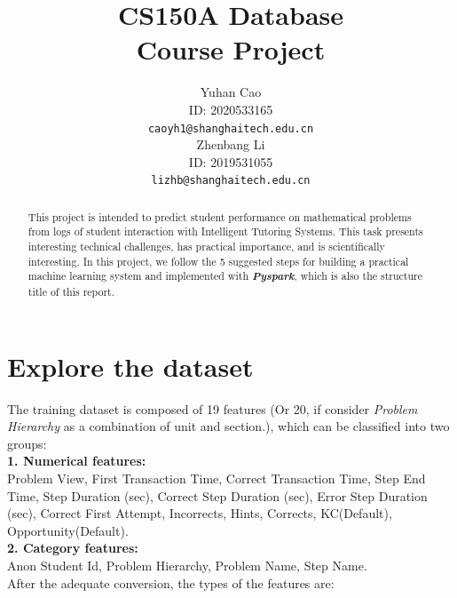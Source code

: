 \documentclass{article}
\title{CS150A Database \\Course Project}
\author{
  Yuhan Cao\\
  ID: 2020533165\\
  \texttt{caoyh1@shanghaitech.edu.cn} \\
   \And
  Zhenbang Li\\
  ID: 2019531055\\
  \texttt{lizhb@shanghaitech.edu.cn}
}
\begin{document}

\maketitle

\begin{abstract}
This project is intended to predict student performance on mathematical problems from logs of
student interaction with Intelligent Tutoring Systems. This task presents interesting technical
challenges, has practical importance, and is scientifically interesting. In this project, we follow the 5 suggested steps for building a practical machine learning system and implemented with \textbf{\textit{Pyspark}}, which is also the structure title of this report.
\end{abstract}

\section{Explore the dataset}
The training dataset is composed of 19 features (Or 20, if consider\textit{ Problem Hierarchy} as a combination of unit and section.), which can be classified into two groups: \\
\textbf{1. Numerical features:}\\
Problem View, First Transaction Time, Correct Transaction Time, Step End Time, Step Duration (sec), Correct Step Duration (sec), Error Step Duration (sec), Correct First Attempt, Incorrects, Hints, Corrects, KC(Default), Opportunity(Default).	\\
\textbf{2. Category features:}\\
Anon Student Id, Problem Hierarchy, Problem Name, Step Name.\\
After the adequate conversion, the types of the features are:
\end{document}
